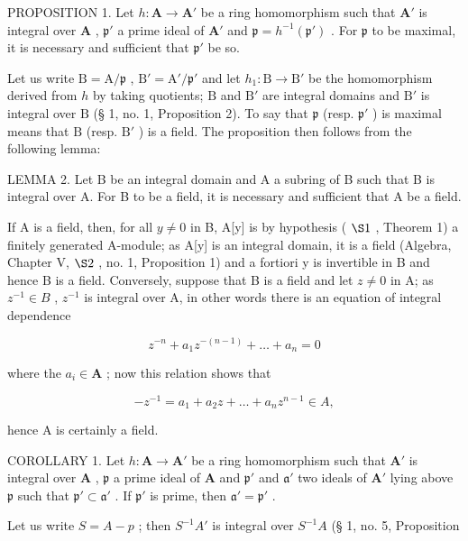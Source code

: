 PROPOSITION 1. Let \(h: \mathbf{A} \to \mathbf{A}'\) be a ring homomorphism such that \(\mathbf{A}'\) is integral over \(\mathbf{A}\) , \(\mathfrak{p}'\) a prime ideal of \(\mathbf{A}'\) and \(\mathfrak{p} = h^{-1}(\mathfrak{p}')\) . For \(\mathfrak{p}\) to be maximal, it is necessary and sufficient that \(\mathfrak{p}'\) be so.

Let us write \(\mathrm{B} = \mathrm{A} / \mathfrak{p}\) , \(\mathrm{B}' = \mathrm{A}' / \mathfrak{p}'\) and let \(h_1 \colon \mathrm{B} \to \mathrm{B}'\) be the homomorphism derived from \(h\) by taking quotients; \(\mathrm{B}\) and \(\mathrm{B}'\) are integral domains and \(\mathrm{B}'\) is integral over \(\mathrm{B}\) (§ 1, no. 1, Proposition 2). To say that \(\mathfrak{p}\) (resp. \(\mathfrak{p}'\) ) is maximal means that \(\mathrm{B}\) (resp. \(\mathrm{B}'\) ) is a field. The proposition then follows from the following lemma:

LEMMA 2. Let B be an integral domain and A a subring of B such that B is integral over A. For B to be a field, it is necessary and sufficient that A be a field.

If A is a field, then, for all \(y \neq 0\) in B, A[y] is by hypothesis ( \(\S 1\) , Theorem 1) a finitely generated A-module; as A[y] is an integral domain, it is a field (Algebra, Chapter V, \(\S 2\) , no. 1, Proposition 1) and a fortiori y is invertible in B and hence B is a field. Conversely, suppose that B is a field and let \(z \neq 0\) in A; as \(z^{-1} \in B\) , \(z^{-1}\) is integral over A, in other words there is an equation of integral dependence

\[
z ^ {- n} + a _ {1} z ^ {- (n - 1)} + \dots + a _ {n} = 0
\]

where the \(a_{i} \in \mathbf{A}\) ; now this relation shows that

\[
- z ^ {- 1} = a _ {1} + a _ {2} z + \dots + a _ {n} z ^ {n - 1} \in A,
\]

hence A is certainly a field.

COROLLARY 1. Let \(h: \mathbf{A} \to \mathbf{A}'\) be a ring homomorphism such that \(\mathbf{A}'\) is integral over \(\mathbf{A}\) , \(\mathfrak{p}\) a prime ideal of \(\mathbf{A}\) and \(\mathfrak{p}'\) and \(\mathfrak{a}'\) two ideals of \(\mathbf{A}'\) lying above \(\mathfrak{p}\) such that \(\mathfrak{p}' \subset \mathfrak{a}'\) . If \(\mathfrak{p}'\) is prime, then \(\mathfrak{a}' = \mathfrak{p}'\) .

Let us write \(S = A - p\) ; then \(S^{-1}A'\) is integral over \(S^{-1}A\) (§ 1, no. 5, Proposition

